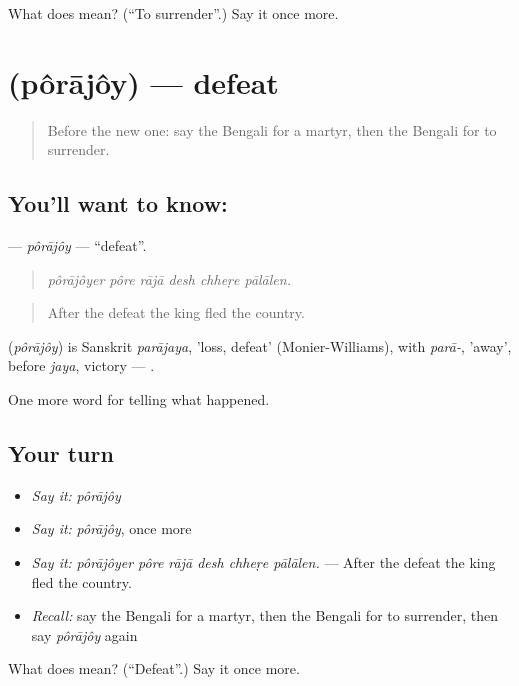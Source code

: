 \begin{tcolorbox}[breakable,colback=teal!4,colframe=teal!35!black,title={Before you move on}]
What does   mean? (\textquotedblleft{}To surrender\textquotedblright{}.) Say it once more.
\end{tcolorbox}
\section[\texorpdfstring{\bn{পরাজয়} (pôrājôy)}{পরাজয় (pôrājôy)}]{ (pôrājôy) — defeat}

\label{lesson:BN-C317-porajoy}



\begin{quote}
Before the new one: say the Bengali for a martyr, then the Bengali for to surrender.
\end{quote}

\subsection*{You'll want to know: }
\textbf{} — \emph{pôrājôy} — \textquotedblleft{}defeat\textquotedblright{}.

\begin{quote}
     
\end{quote}

\begin{quote}
\emph{pôrājôyer pôre rājā desh chheṛe pālālen.}
\end{quote}

\begin{quote}
After the defeat the king fled the country.
\end{quote}

\begin{cousinweb}
\textbf{} (\emph{pôrājôy}) is Sanskrit \emph{parājaya}, 'loss, defeat' (Monier-Williams), with \emph{parā-}, 'away', before \emph{jaya}, victory — \textbf{}.
\end{cousinweb}

\begin{grammarlens}[title={What you've built}]
One more word for telling what happened.
\end{grammarlens}

\subsection*{Your turn}
\begin{itemize}
\raggedright
  \item \emph{Say it:} \emph{pôrājôy}
  \item \emph{Say it:} \emph{pôrājôy}, once more
  \item \emph{Say it:} \emph{pôrājôyer pôre rājā desh chheṛe pālālen.} — After the defeat the king fled the country.
  \item \emph{Recall:} say the Bengali for a martyr, then the Bengali for to surrender, then say \emph{pôrājôy} again
\end{itemize}

\begin{tcolorbox}[breakable,colback=teal!4,colframe=teal!35!black,title={Before you move on}]
What does  mean? (\textquotedblleft{}Defeat\textquotedblright{}.) Say it once more.
\end{tcolorbox}
